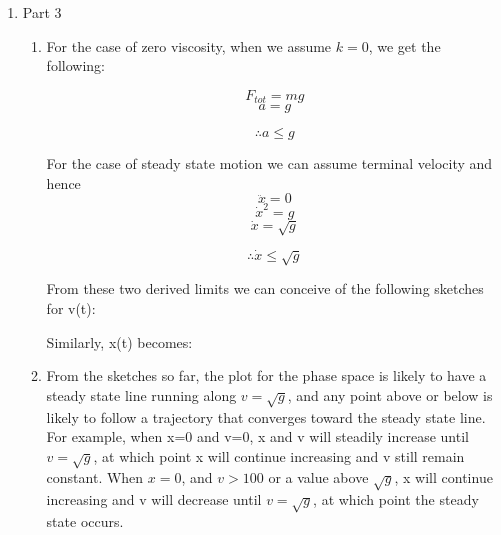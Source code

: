 \documentclass{article}
\begin{document}
\begin{enumerate}
\begin{enumerate}[label*=\arabic*.]
	
	
 \end{enumerate}
 \item Part 3
 \begin{enumerate}[label*=\arabic*.]
 
 	\item For the case of zero viscosity, when we assume $k=0$, we get the following:
	
	\[ F_{tot} = mg \]
	\[ a = g \]
	
	\begin{equation}
	\therefore a \leqslant g
	\end{equation}
	
	For the case of steady state motion we can assume terminal velocity and hence
	\[ \ddot{x} = 0 \]
	\[ \dot{x}^2 = g \]
	\[ \dot{x} = \sqrt{g} \]
	
	\begin{equation}
	\therefore \dot{x} \leqslant \sqrt{g}
	\end{equation}
	
	From these two derived limits we can conceive of the following sketches for v(t):
	
	
	Similarly, x(t) becomes:
	
	
\item From the sketches so far, the plot for the phase space is likely to have a steady state line running along $v=\sqrt{g}$, and any point above or below is likely to follow a trajectory that converges toward the steady state line. For example, when x=0 and v=0, x and v will steadily increase until $v=\sqrt{g}$, at which point x will continue increasing and v still remain constant.
When $x=0$, and $v>100$ or a value above $\sqrt{g}$, x will continue increasing and v will decrease until $v=\sqrt{g}$, at which point the steady state occurs.


\end{enumerate}
\end{enumerate}
\end{document}
